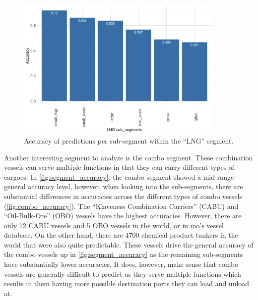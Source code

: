 \begin{figure}[htbp]
    \centering
    \includegraphics[width=0.9\textwidth]{figures/results/seg_lng_acc}
    \caption{Accuracy of predictions per sub-segment within the ``LNG'' segment.}
    \label{fig:lng_accuracy}
\end{figure}

Another interesting segment to analyze is the combo segment. These combination vessels can serve multiple functions in that they can carry different types of cargoes. In \cref{fig:segment_accuracy}, the combo segment showed a mid-range general accuracy level, however, when looking into the sub-segments, there are substantial differences in accuracies across the different types of combo vessels (\cref{fig:combo_accuracy}). The ``Klaveness Combination Carriers'' (CABU) and ``Oil-Bulk-Ore'' (OBO) vessels have the highest accuracies. However, there are only 12 CABU vessels and 5 OBO vessels in the world, or in \acrfull{mo}'s vessel database. On the other hand, there are 4700 chemical product tankers in the world that were also quite predictable. These vessels drive the general accuracy of the combo vessels up in \cref{fig:segment_accuracy} as the remaining sub-segments have substantially lower accuracies. It does, however, make sense that combo vessels are generally difficult to predict as they serve multiple functions which results in them having more possible destination ports they can load and unload at.


